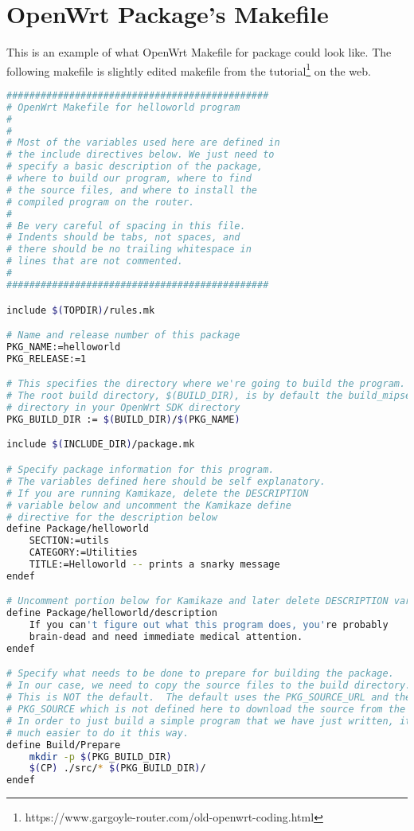 \chapter{OpenWrt Package's Makefile}\label{hello_mkfile}
This is an example of what OpenWrt Makefile for package could look like.
The following makefile is slightly edited makefile from the tutorial\footnote{https://www.gargoyle-router.com/old-openwrt-coding.html} on the web.
\begin{lstlisting}[language=bash,basicstyle=\ttfamily\footnotesize,caption=Makefile for Helloworld.]
##############################################
# OpenWrt Makefile for helloworld program
#
#
# Most of the variables used here are defined in
# the include directives below. We just need to
# specify a basic description of the package,
# where to build our program, where to find
# the source files, and where to install the
# compiled program on the router.
#
# Be very careful of spacing in this file.
# Indents should be tabs, not spaces, and
# there should be no trailing whitespace in
# lines that are not commented.
#
##############################################

include $(TOPDIR)/rules.mk

# Name and release number of this package
PKG_NAME:=helloworld
PKG_RELEASE:=1

# This specifies the directory where we're going to build the program.
# The root build directory, $(BUILD_DIR), is by default the build_mipsel
# directory in your OpenWrt SDK directory
PKG_BUILD_DIR := $(BUILD_DIR)/$(PKG_NAME)

include $(INCLUDE_DIR)/package.mk

# Specify package information for this program.
# The variables defined here should be self explanatory.
# If you are running Kamikaze, delete the DESCRIPTION
# variable below and uncomment the Kamikaze define
# directive for the description below
define Package/helloworld
	SECTION:=utils
	CATEGORY:=Utilities
	TITLE:=Helloworld -- prints a snarky message
endef

# Uncomment portion below for Kamikaze and later delete DESCRIPTION variable above
define Package/helloworld/description
	If you can't figure out what this program does, you're probably
	brain-dead and need immediate medical attention.
endef

# Specify what needs to be done to prepare for building the package.
# In our case, we need to copy the source files to the build directory.
# This is NOT the default.  The default uses the PKG_SOURCE_URL and the
# PKG_SOURCE which is not defined here to download the source from the web.
# In order to just build a simple program that we have just written, it is
# much easier to do it this way.
define Build/Prepare
	mkdir -p $(PKG_BUILD_DIR)
	$(CP) ./src/* $(PKG_BUILD_DIR)/
endef


\end{lstlisting}
